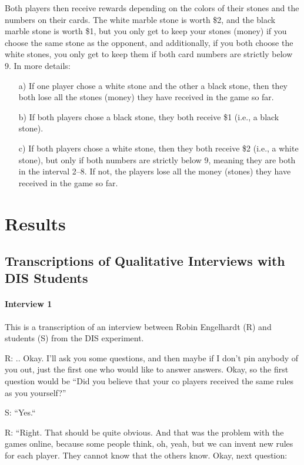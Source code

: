 \documentclass[a4paper,superscriptaddress,nofootinbib]{revtex4}
\begin{document}
Both players then receive rewards depending on the colors of their stones and the numbers on their cards. The white marble stone is worth \$2, and the black marble stone is worth \$1, but you only get to keep your stones (money) if you choose the same stone as the opponent, and additionally, if you both choose the white stones, you only get to keep them if both card numbers are strictly below 9. In more details:  
\begin{enumerate}
\item[a)] If one player chose a white stone and the other a black stone, then they both lose all the stones (money) they have received in the game so far.
\item[b)] If both players chose a black stone, they both receive \$1 (i.e., a black stone).
\item[c)] If both players chose a white stone, then they both receive \$2 (i.e., a white stone), but only if both numbers are strictly below 9, meaning they are both in the interval 2--8. If not, the players lose all the money (stones) they have received in the game so far.
\end{enumerate} 

\section{Results} 

\subsection{Transcriptions of Qualitative Interviews with DIS Students}


\paragraph{Interview 1}
This is a transcription of an interview between Robin Engelhardt (R) and students (S) from the DIS experiment.


\medskip
R: .. Okay. I'll ask you some questions, and then maybe if I don't pin anybody of you out, just the first one who would like to answer answers. Okay, so the first question would be 
“Did you believe that your co players received the same rules as you yourself?” 

S: “Yes.“

R: “Right. That should be quite obvious. And that was the problem with the games online, because some people think, oh, yeah, but we can invent new rules for each player. They cannot know that the others know. Okay, next question:
\end{document}
